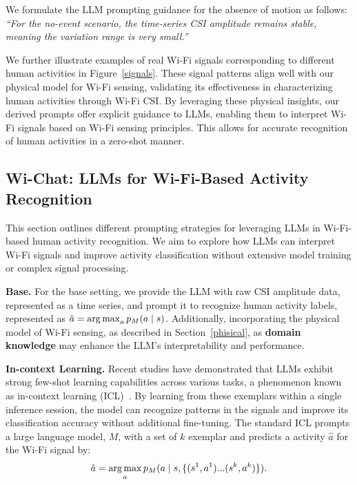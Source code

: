 We formulate the LLM prompting guidance for the absence of motion as follows: 
\emph{``For the no-event scenario, the time-series CSI amplitude remains stable, meaning the variation range is very small.''}



We further illustrate examples of real Wi-Fi signals corresponding to different human activities in Figure~\ref{signals}. These signal patterns align well with our physical model for Wi-Fi sensing, validating its effectiveness in characterizing human activities through Wi-Fi CSI.
By leveraging these physical insights, our derived prompts offer explicit guidance to LLMs, enabling them to interpret Wi-Fi signals based on Wi-Fi sensing principles. This allows for accurate recognition of human activities in a zero-shot manner.












\vspace{-2mm}
\subsection{Wi-Chat: LLMs for Wi-Fi-Based Activity Recognition}

This section outlines different prompting strategies for leveraging LLMs in Wi-Fi-based human activity recognition. We aim to explore how LLMs can interpret Wi-Fi signals and improve activity classification without extensive model training or complex signal processing.

\textbf{Base.} 
For the base setting, we provide the LLM with raw CSI amplitude data, represented as a time series, and prompt it to recognize human activity labels, represented as $\hat{a}=\operatorname*{arg\,max}_a p_{M}(a\mid s)$. Additionally, incorporating the physical model of Wi-Fi sensing, as described in Section~\ref{phisical}, as \textbf{domain knowledge} may enhance the LLM's interpretability and performance.

\textbf{In-context Learning.}
Recent studies have demonstrated that LLMs exhibit strong few-shot learning capabilities across various tasks, a phenomenon known as in-context learning (ICL)~\cite{brown2020language}. By learning from these exemplars within a single inference session, the model can recognize patterns in the signals and improve its classification accuracy without additional fine-tuning. The standard ICL prompts a large language model, $M$, with a set of $k$ exemplar and predicts a activity $\hat{a}$ for the Wi-Fi signal by:
\vspace{-3mm}
\begin{equation}
    \hat{a}=\operatorname*{arg\,max}_a p_{M}(a\mid s,\{(s^1,a^1)...(s^k,a^k)\}).
\end{equation}

